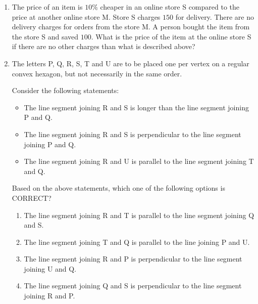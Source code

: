 \documentclass[journal,12pt,onecolumn]{IEEEtran}
\theoremstyle{remark}
\begin{document}
\begin{enumerate}
\begin{enumerate}
\begin{multicols}{4}
\end{multicols}
\end{enumerate}


\item The price of an item is $10\%$ cheaper in an online store S compared to the price at another online store M. Store S charges  $150$ for delivery. There are no delivery charges for orders from the store M. A person bought the item from the store S and saved  $100$. What is the price of the item at the online store S  if there are no other charges than what is described above?

\hfill{}

\begin{enumerate}
\end{enumerate}

\item The letters P, Q, R, S, T and U are to be placed one per vertex on a regular convex hexagon, but not necessarily in the same order.  

Consider the following statements$\colon$
\begin{itemize}
\item The line segment joining R and S is longer than the line segment joining P and Q.  
\item The line segment joining R and S is perpendicular to the line segment joining P and Q.  
\item The line segment joining R and U is parallel to the line segment joining T and Q.  \end{itemize}

Based on the above statements, which one of the following options is CORRECT?

\hfill{}

\begin{enumerate}
\item The line segment joining R and T is parallel to the line segment joining Q and S.
\item The line segment joining T and Q is parallel to the line joining P and U.
\item The line segment joining R and P is perpendicular to the line segment joining U and Q.
\item The line segment joining Q and S is perpendicular to the line segment joining R and P.
\end{enumerate}


\end{enumerate}
\end{document}
